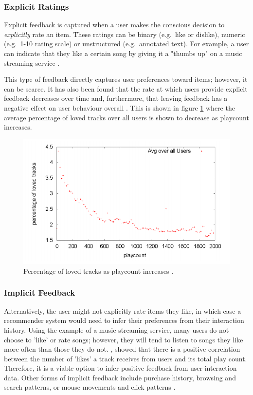 \subsubsection{Explicit Ratings}
Explicit feedback is captured when a user makes the conscious decision to \textit{explicitly} rate an item. These ratings can be binary (e.g.\ like or dislike), numeric (e.g.\ 1-10 rating scale) or unstructured (e.g.\ annotated text). For example, a user can indicate that they like a certain song by giving it a "thumbs up" on a music streaming service \parencite{cf_1.5_explicit}.

This type of feedback directly captures user preferences toward items; however, it can be scarce. It has also been found that the rate at which users provide explicit feedback decreases over time and, furthermore, that leaving feedback has a negative effect on user behaviour overall \parencite{cf_1.5_explicit}. This is shown in figure \ref{fig:playcount} where the average percentage of loved tracks over all users is shown to decrease as playcount increases.

\begin{figure}[H]
\centering
\includegraphics[width=13cm]{Figures/2_2_playcount-vs-loved.png}
\decoRule
\caption[Playcount-loved]{Percentage of loved tracks as playcount increases \parencite{cf_1.5_explicit}.}
\label{fig:playcount}
\end{figure}

\subsubsection{Implicit Feedback}
Alternatively, the user might not explicitly rate items they like, in which case a recommender system would need to infer their preferences from their interaction history. Using the example of a music streaming service, many users do not choose to 'like' or rate songs; however, they will tend to listen to songs they like more often than those they do not. \cite{cf_1.5_explicit}, showed that there is a positive correlation between the number of 'likes' a track receives from users and its total play count. Therefore, it is a viable option to infer positive feedback from user interaction data. Other forms of implicit feedback include purchase history, browsing and search patterns, or mouse movements and click patterns \parencite{handbook_1.5_cf}.

